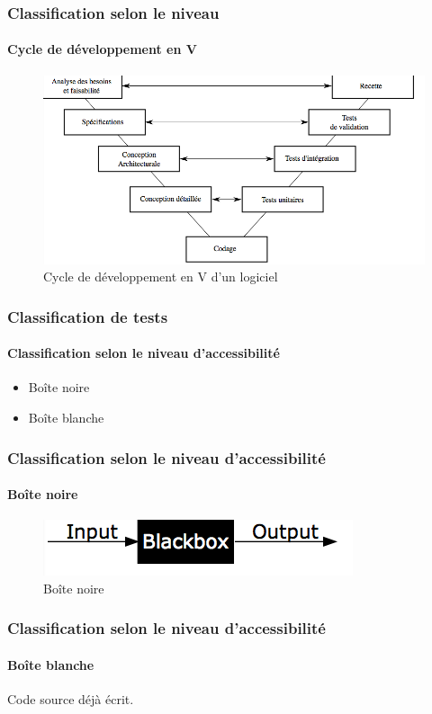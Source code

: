 \documentclass{beamer}
\begin{document}
\begin{frame}
	\frametitle{Classification selon le niveau}
	\framesubtitle{Cycle de d\'{e}veloppement en V}
	
		\begin{figure}
			\centering
			\caption{Cycle de d\'{e}veloppement en V d'un logiciel}
			\includegraphics[scale=0.39]{img/niveau}
		\end{figure}	
\end{frame}

\begin{frame}
	\frametitle{Classification de tests}
	\framesubtitle{Classification selon le niveau d'accessibilit\'{e}}
		\begin{itemize}
			\item Bo\^{i}te noire
			\item Bo\^{i}te blanche
		\end{itemize}
\end{frame}

\begin{frame}
	\frametitle{Classification selon le niveau d'accessibilit\'{e}}
	\framesubtitle{Bo\^{i}te noire}
	
		\begin{figure}
			\centering
			\caption{Bo\^{i}te noire}
			\includegraphics[scale=0.5]{img/boitenoire}
		\end{figure}	
\end{frame}

\begin{frame}
	\frametitle{Classification selon le niveau d'accessibilit\'{e}}
	\framesubtitle{Bo\^{i}te blanche}
		\par Code source d\'{e}j\`{a} \'{e}crit.			
\end{frame}
\end{document}

